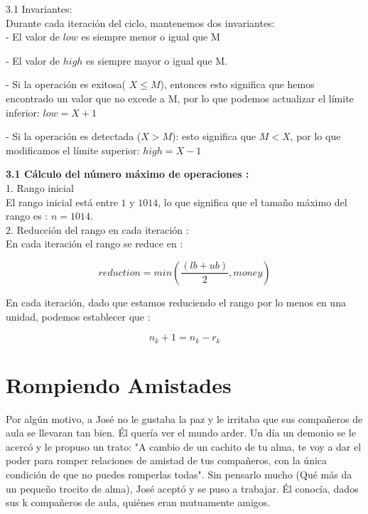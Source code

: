 \documentclass[
10pt, %
a4paper, %
oneside, %
headinclude,footinclude, %
BCOR5mm, %
]{scrartcl}
\begin{document}
3.1 Invariantes:\\

Durante cada iteración del ciclo, mantenemos dos invariantes:\\


- El valor de $low$ es siempre menor o igual que M


- El valor de $high$ es siempre mayor o igual que M.


- Si la operación es exitosa( $X \leq M$), entonces esto significa que hemos encontrado un valor que no excede a M, por lo que podemos actualizar el límite inferior: $low = X+1$


- Si la operación es detectada ($X > M$): esto significa que $M < X$, por lo que modificamos el límite superior: $high = X -1$

\textbf{3.1 Cálculo del número máximo de operaciones :}\\

1. Rango inicial \\

El rango inicial está entre $1$ y $1014$, lo que significa que el tamaño máximo del rango es : $n = 1014$.\\

2. Reducción del rango en cada iteración : \\

En cada iteraci\'on el rango se reduce en :

$$
reduction = min(\frac{(lb+ub)}{2}, money)
$$

En cada iteración, dado que estamos reduciendo el rango por lo menos en una unidad, podemos establecer que :

$$
n_k+1 = n_k - r_k
$$



\section{Rompiendo Amistades}

Por algún motivo, a José no le gustaba la paz y le irritaba que sus compañeros de aula se llevaran tan bien. Él quería ver
el mundo arder. Un día un demonio se le acercó y le propuso un trato: "A cambio de un cachito de tu alma, te voy a dar el poder para
romper relaciones de amistad de tus compañeros, con la única condición de que no puedes romperlas todas". Sin pensarlo mucho (Qué más
da un pequeño trocito de alma), José aceptó y se puso a trabajar. Él conocía, dados sus k compañeros de aula, quiénes eran mutuamente
amigos.\\
\end{document}
